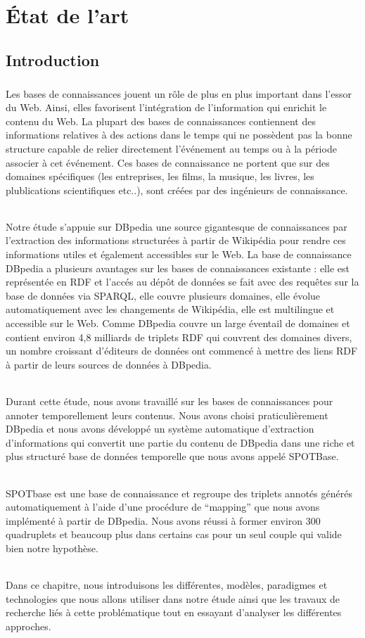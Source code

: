 \documentclass[12pt,a4]{report}
\begin{document}
\chapter{État de l'art}
\section{Introduction}
\paragraph{}
Les bases de connaissances jouent un rôle de plus en plus important dans l'essor du Web. Ainsi, elles favorisent l'intégration de l'information qui enrichit le contenu du Web. La plupart des bases de connaissances contiennent des informations relatives à des actions dans le temps qui ne possèdent pas la bonne structure capable de relier directement l'événement au temps ou à la période associer à cet événement.
Ces bases de connaissance ne portent que sur des domaines spécifiques (les entreprises, les films, la musique, les livres, les plublications scientifiques etc..), sont créées par des ingénieurs de connaissance. 
\subparagraph{}
Notre étude s'appuie sur DBpedia une source gigantesque de connaissances par l'extraction des informations structurées à partir de Wikipédia pour rendre ces informations utiles et également accessibles sur le Web. La base de connaissance DBpedia a plusieurs avantages sur les bases de connaissances existante : elle est représentée en RDF et l'accés au dépôt de données se fait avec des requêtes sur la base de données via SPARQL, elle couvre plusieurs domaines, elle évolue automatiquement avec les changements de Wikipédia, elle est multilingue et accessible sur le Web. 
Comme DBpedia couvre un large éventail de domaines et contient environ 4,8 milliards de triplets RDF qui couvrent des domaines divers, un nombre croissant d'éditeurs de données ont commencé à mettre des liens RDF à partir de leurs sources de données à DBpedia.
\subparagraph{}
Durant cette étude, nous avons travaillé sur les bases de connaissances pour annoter temporellement leurs contenus. Nous avons choisi praticulièrement DBpedia et nous avons développé un système automatique d'extraction d'informations qui convertit une partie du contenu de DBpedia dans une riche et plus structuré base de données temporelle que nous avons appelé SPOTBase.
\subparagraph{}
SPOTbase est une base de connaissance et regroupe des triplets annotés générés automatiquement à l'aide d'une procédure de ``mapping'' que nous avons implémenté à partir de DBpedia.
Nous avons réussi à former environ $300$ quadruplets et beaucoup plus dans certains cas pour un seul couple qui valide bien notre hypothèse.
\subparagraph{}
Dans ce chapitre, nous introduisons les différentes, modèles, paradigmes et technologies que nous allons utiliser dans notre étude ainsi que les travaux de recherche liés à cette problématique tout en essayant d'analyser les différentes approches.
\end{document}
